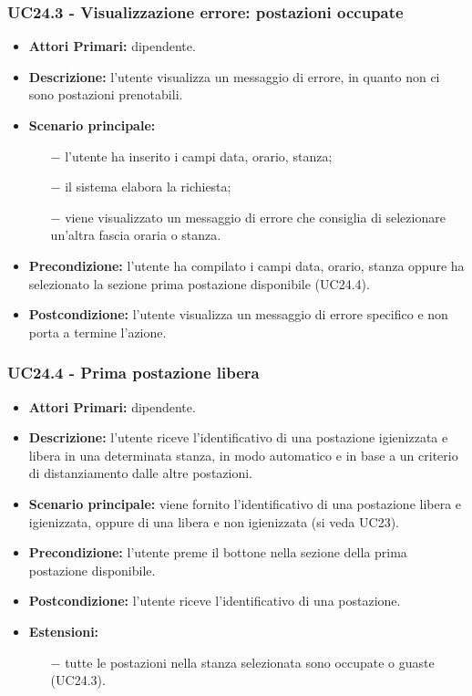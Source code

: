\subsubsection{ UC24.3 - Visualizzazione errore: postazioni occupate }
\begin{itemize}
	\item\textbf{Attori Primari:} dipendente.
	\item\textbf{Descrizione:} l’utente visualizza un messaggio di errore, in quanto non ci sono postazioni prenotabili.
	\item\textbf{Scenario principale:} 
	\begin{itemize}
		\item[$-$] l’utente ha inserito i campi data, orario, stanza;
		\item[$-$] il sistema elabora la richiesta;
		\item[$-$] viene visualizzato un messaggio di errore che consiglia di selezionare un'altra fascia oraria o stanza.
	\end{itemize}
	\item\textbf{Precondizione:} l’utente ha compilato i campi data, orario, stanza oppure ha selezionato la sezione prima postazione disponibile (UC24.4).
	\item\textbf{Postcondizione:} l’utente visualizza un messaggio di errore specifico e non porta a termine l’azione.
\end{itemize}
\subsubsection{ UC24.4 - Prima postazione libera }
\begin{itemize}
	\item\textbf{Attori Primari:} dipendente.
	\item\textbf{Descrizione:} l’utente riceve l'identificativo di una postazione igienizzata e libera in una determinata stanza, 
	in modo automatico e in base a un criterio di distanziamento dalle altre postazioni.
	\item\textbf{Scenario principale:} viene fornito l'identificativo di una postazione libera e igienizzata, oppure di una libera e non igienizzata (si veda UC23).
	\item\textbf{Precondizione:} l’utente preme il bottone nella sezione della prima postazione disponibile.
	\item\textbf{Postcondizione:} l’utente riceve l'identificativo di una postazione.
	\item\textbf{Estensioni:}
	\begin{itemize}
		\item[$-$] tutte le postazioni nella stanza selezionata sono occupate o guaste (UC24.3).
	\end{itemize}
\end{itemize}
